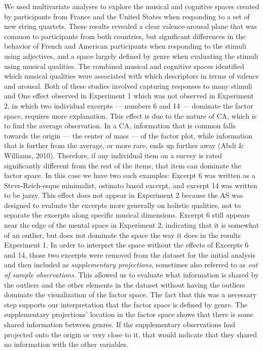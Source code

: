 \documentclass[
  english,
  man,floatsintext]{apa6}
\begin{document}
We used multivariate analyses to explore the musical and cognitive spaces created by participants from France and the United States when responding to a set of new string quartets. These results revealed a clear valence-arousal plane that was common to participants from both countries, but significant differences in the behavior of French and American participants when responding to the stimuli using adjectives, and a space largely defined by genre when evaluating the stimuli using musical qualities. The combined musical and cognitive spaces identified which musical qualities were associated with which descriptors in terms of valence and arousal. Both of these studies involved capturing responses to many stimuli and
One effect observed in Experiment 1 which was not observed in Experiment 2, in which two individual excerpts --- numbers 6 and 14 --- dominate the factor space, requires more explanation. This effect is due to the nature of CA, which is to find the average observation. In a CA, information that is common falls towards the origin --- the center of mass --- of the factor plot, while information that is further from the average, or more rare, ends up further away (Abdi \& Williams, 2010). Therefore, if any individual item on a survey is rated significantly different from the rest of the items, that item can dominate the factor space. In this case we have two such examples: Excerpt 6 was written as a Steve-Reich-esque minimalist, ostinato based excerpt, and excerpt 14 was written to be jazzy. This effect does not appear in Experiment 2 because the AS was designed to evaluate the excerpts more generally on holistic qualities, not to separate the excerpts along specific musical dimensions. Excerpt 6 still appears near the edge of the mental space in Experiment 2, indicating that it is somewhat of an outlier, but does not dominate the space the way it does in the results Experiment 1.
In order to interpret the space without the effects of Excerpts 6 and 14, those two excerpts were removed from the dataset for the initial analysis and then included as \emph{supplementary projections}, sometimes also referred to as \emph{out of sample observations}. This allowed us to evaluate what information is shared by the outliers and the other elements in the dataset without having the outliers dominate the visualization of the factor space. The fact that this was a necessary step supports our interpretation that the factor space is defined by genre. The supplementary projections' location in the factor space shows that there is some shared information between genres. If the supplementary observations had projected onto the origin or very close to it, that would indicate that they shared no information with the other variables.
\end{document}
